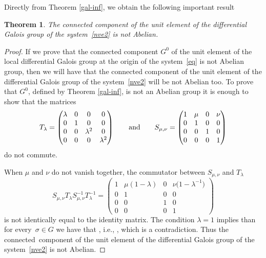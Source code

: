 \documentclass[pdftex]{sigma}
\numberwithin{equation}{section}
\newtheorem{Theorem}{Theorem}[section]
\begin{document}
 Directly from Theorem \ref{gal-inf}, we obtain the following important result

 \begin{Theorem}\label{g0}
 The connected component of the unit element of the differential Galois group of the system~\eqref{nve2}
 is not Abelian.
 \end{Theorem}

 \begin{proof}
 If we prove that the connected component $G^0$ of the unit element of the local differential Galois group at the origin of the system~\eqref{eq} is not Abelian
 group, then we will have that the connected component of the unit element of the differential Galois group of the system~\eqref{nve2} will be not Abelian too.
 To prove that $G^0$, defined by Theorem \ref{gal-inf}, is not an Abelian group it is enough to show that the matrices{\samepage
 \[
 T_{\lambda}=\begin{pmatrix}
 	\lambda & 0 & 0 & 0\\
 	0 & 1 & 0 & 0\\
 	0 & 0 & \lambda^2 & 0\\
 	0 & 0 & 0 & \lambda^2
 \end{pmatrix} \qquad {\rm and} \qquad
 S_{\mu, \nu}=\begin{pmatrix}
 	1 & \mu & 0 & \nu\\
 	0 & 1 & 0 & 0\\
 	0 & 0 & 1 & 0\\
 	0 & 0 & 0 & 1
 \end{pmatrix}
 \]
 do not commute.}

 When $\mu$ and $\nu$ do not vanish together, the commutator between $S_{\mu, \nu}$ and $T_{\lambda}$
 \[
 S_{\mu, \nu} T_{\lambda} S^{-1}_{\mu, \nu} T^{-1}_{\lambda}=
 \begin{pmatrix}
 1 & \mu (1-\lambda) & 0 & \nu \bigl(1- \lambda^{-1}\bigr)\\
 0 & 1 & 0 & 0\\
 0 & 0 & 1 & 0\\
 0 & 0 & 0 & 1
 \end{pmatrix}
 \]
 is not identically equal to the identity matrix. The condition $\lambda=1$ implies than for every~${\sigma\in G}$ we have that , i.e.,
 , which is a contradiction. Thus the connected~component of the unit element
 of the differential Galois group of the system~\eqref{nve2} is not Abelian.
 \end{proof}
\end{document}
